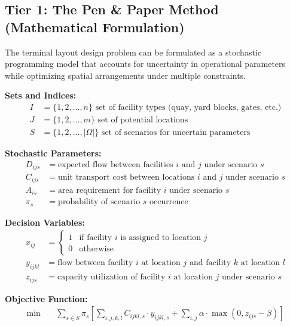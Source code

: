 \documentclass{article}
\begin{document}
\subsection{Tier 1: The Pen \& Paper Method (Mathematical Formulation)}

The terminal layout design problem can be formulated as a stochastic programming model that accounts for uncertainty in operational parameters while optimizing spatial arrangements under multiple constraints.

\textbf{Sets and Indices:}
\begin{align}
I &= \{1, 2, \ldots, n\} \text{ set of facility types (quay, yard blocks, gates, etc.)} \\
J &= \{1, 2, \ldots, m\} \text{ set of potential locations} \\
S &= \{1, 2, \ldots, |\Omega|\} \text{ set of scenarios for uncertain parameters}
\end{align}

\textbf{Stochastic Parameters:}
\begin{align}
D_{ijs} &= \text{expected flow between facilities } i \text{ and } j \text{ under scenario } s \\
C_{ijs} &= \text{unit transport cost between locations } i \text{ and } j \text{ under scenario } s \\
A_{is} &= \text{area requirement for facility } i \text{ under scenario } s \\
\pi_s &= \text{probability of scenario } s \text{ occurrence}
\end{align}

\textbf{Decision Variables:}
\begin{align}
x_{ij} &= \begin{cases} 
1 & \text{if facility } i \text{ is assigned to location } j \\
0 & \text{otherwise}
\end{cases} \\
y_{ijkl} &= \text{flow between facility } i \text{ at location } j \text{ and facility } k \text{ at location } l \\
z_{ijs} &= \text{capacity utilization of facility } i \text{ at location } j \text{ under scenario } s
\end{align}

\textbf{Objective Function:}
\begin{align}
\min \quad &\sum_{s \in S} \pi_s \left[ \sum_{i,j,k,l} C_{ijkl,s} \cdot y_{ijkl,s} + \sum_{i,j} \alpha \cdot \max(0, z_{ijs} - \beta) \right]
\end{align}
\end{document}
